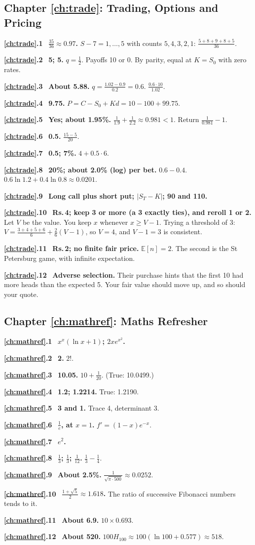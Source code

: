 \documentclass[11pt,a4paper,openany]{report}
\newcommand{\Rs}{Rs.\,}
\newcommand{\solchapter}[2]{\subsection*{Chapter \ref*{#1}: #2}\def\solprefix{\ref*{#1}}}
\newcommand{\sol}[1]{\par\smallskip\textbf{\solprefix.#1}\ }
\newcommand{\E}{\mathbb{E}}
\begin{document}
\solchapter{ch:trade}{Trading, Options and Pricing}
\sol{1} \textbf{$\frac{35}{36}\approx0.97$.} $S-7=1,\dots,5$ with counts $5,4,3,2,1$: $\frac{5+8+9+8+5}{36}$.
\sol{2} \textbf{5; 5.} $q=\frac12$. Payoffs 10 or 0. By parity, equal at $K=S_0$ with zero rates.
\sol{3} \textbf{About 5.88.} $q=\frac{1.02-0.9}{0.2}=0.6$. $\frac{0.6\cdot10}{1.02}$.
\sol{4} \textbf{9.75.} $P=C-S_0+Kd=10-100+99.75$.
\sol{5} \textbf{Yes; about 1.95\%.} $\frac1{1.9}+\frac1{2.2}\approx0.981<1$. Return $\frac1{0.981}-1$.
\sol{6} \textbf{0.5.} $\frac{15-5}{20}$.
\sol{7} \textbf{0.5; 7\%.} $4+0.5\cdot6$.
\sol{8} \textbf{20\%; about 2.0\% (log) per bet.} $0.6-0.4$. $0.6\ln1.2+0.4\ln0.8\approx0.0201$.
\sol{9} \textbf{Long call plus short put; $|S_T-K|$; 90 and 110.}
\sol{10} \textbf{\Rs4; keep 3 or more (a 3 exactly ties), and reroll 1 or 2.} Let $V$ be the value. You keep $x$ whenever $x\ge V-1$. Trying a threshold of 3: $V=\frac{3+4+5+6}6+\frac26(V-1)$, so $V=4$, and $V-1=3$ is consistent.
\sol{11} \textbf{\Rs2; no finite fair price.} $\E[n]=2$. The second is the St Petersburg game, with infinite expectation.
\sol{12} \textbf{Adverse selection.} Their purchase hints that the first 10 had more heads than the expected 5. Your fair value should move up, and so should your quote.

\solchapter{ch:mathref}{Maths Refresher}
\sol{1} \textbf{$x^x(\ln x+1)$; $2xe^{x^2}$.}
\sol{2} \textbf{2.} $2!$.
\sol{3} \textbf{10.05.} $10+\frac1{20}$. (True: 10.0499.)
\sol{4} \textbf{1.2; 1.2214.} True: 1.2190.
\sol{5} \textbf{3 and 1.} Trace 4, determinant 3.
\sol{6} \textbf{$\frac1e$, at $x=1$.} $f'=(1-x)e^{-x}$.
\sol{7} \textbf{$e^2$.}
\sol{8} \textbf{$\frac13$; $\frac13$; $\frac1{12}$.} $\frac13-\frac14$.
\sol{9} \textbf{About 2.5\%.} $\frac1{\sqrt{\pi\cdot500}}\approx0.0252$.
\sol{10} \textbf{$\frac{1+\sqrt5}2\approx1.618$.} The ratio of successive Fibonacci numbers tends to it.
\sol{11} \textbf{About 6.9.} $10\times0.693$.
\sol{12} \textbf{About 520.} $100H_{100}\approx100(\ln100+0.577)\approx518$.
\end{document}
